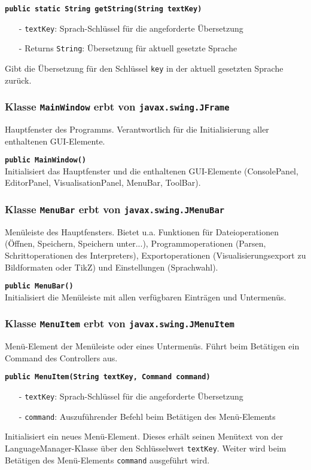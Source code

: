 \documentclass[parskip=full,11pt,twoside]{scrartcl}
\begin{document}
\textbf{\texttt{public static String getString(String textKey)}}
\begin{itemize}[noitemsep]
	\item[-] \texttt{textKey}: Sprach-Schlüssel für die angeforderte Übersetzung
	\item[-] Returns \texttt{String}: Übersetzung für aktuell gesetzte Sprache
\end{itemize}
Gibt die Übersetzung für den Schlüssel \texttt{key} in der aktuell gesetzten Sprache zurück.

\subsubsection{Klasse \texttt{MainWindow} erbt von \texttt{javax.swing.JFrame}}

Hauptfenster des Programms. Verantwortlich für die Initialisierung aller enthaltenen GUI-Elemente.

\textbf{\texttt{public MainWindow()}}\\
Initialisiert das Hauptfenster und die enthaltenen GUI-Elemente (ConsolePanel, EditorPanel, VisualisationPanel, MenuBar, ToolBar).

\subsubsection{Klasse \texttt{MenuBar} erbt von \texttt{javax.swing.JMenuBar}}

Menüleiste des Hauptfensters. Bietet u.a. Funktionen für Dateioperationen (Öffnen, Speichern, Speichern unter...), Programmoperationen (Parsen, Schrittoperationen des Interpreters), Exportoperationen (Visualisierungsexport zu Bildformaten oder TikZ) und Einstellungen (Sprachwahl).

\textbf{\texttt{public MenuBar()}}\\
Initialisiert die Menüleiste mit allen verfügbaren Einträgen und Untermenüs.

\subsubsection{Klasse \texttt{MenuItem} erbt von \texttt{javax.swing.JMenuItem}}

Menü-Element der Menüleiste oder eines Untermenüs. Führt beim Betätigen ein Command des Controllers aus.

\textbf{\texttt{public MenuItem(String textKey, Command command)}}
\begin{itemize}[noitemsep]
	\item[-] \texttt{textKey}: Sprach-Schlüssel für die angeforderte Übersetzung
	\item[-] \texttt{command}: Auszuführender Befehl beim Betätigen des Menü-Elements
\end{itemize}
Initialisiert ein neues Menü-Element. Dieses erhält seinen Menütext von der LanguageManager-Klasse über den Schlüsselwert \texttt{textKey}. Weiter wird beim Betätigen des Menü-Elements \texttt{command} ausgeführt wird.
\end{document}
